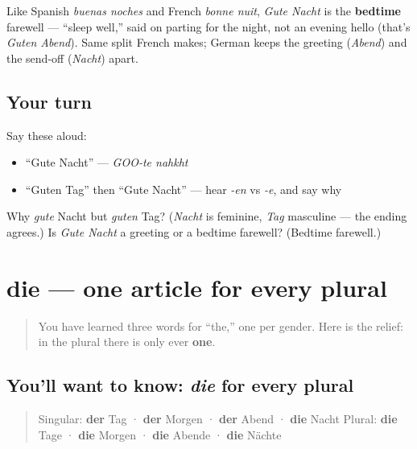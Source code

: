 \begin{culture}
Like Spanish \emph{buenas noches} and French \emph{bonne nuit}, \emph{Gute Nacht} is the \textbf{bedtime} farewell — \textquotedblleft{}sleep well,\textquotedblright{} said on parting for the night, not an evening hello (that's \emph{Guten Abend}). Same split French makes; German keeps the greeting (\emph{Abend}) and the send-off (\emph{Nacht}) apart.
\end{culture}

\subsection*{Your turn}
Say these aloud:

\begin{itemize}
\raggedright
  \item \textquotedblleft{}Gute Nacht\textquotedblright{} — \emph{GOO-te nahkht}
  \item \textquotedblleft{}Guten Tag\textquotedblright{} then \textquotedblleft{}Gute Nacht\textquotedblright{} — hear \emph{-en} vs \emph{-e}, and say why
\end{itemize}

\begin{tcolorbox}[breakable,colback=teal!4,colframe=teal!35!black,title={Before you move on}]
Why \emph{gute} Nacht but \emph{guten} Tag? (\emph{Nacht} is feminine, \emph{Tag} masculine — the ending agrees.) Is \emph{Gute Nacht} a greeting or a bedtime farewell? (Bedtime farewell.)
\end{tcolorbox}
\section[die (plural)]{die — one article for every plural}

\label{lesson:GE-C01-die-plural}



\begin{quote}
You have learned three words for \textquotedblleft{}the,\textquotedblright{} one per gender. Here is the relief: in the plural there is only ever \textbf{one}.
\end{quote}

\subsection*{You'll want to know: \emph{die} for every plural}
\begin{quote}
Singular: \textbf{der} Tag · \textbf{der} Morgen · \textbf{der} Abend · \textbf{die} Nacht Plural: \textbf{die} Tage · \textbf{die} Morgen · \textbf{die} Abende · \textbf{die} Nächte
\end{quote}


